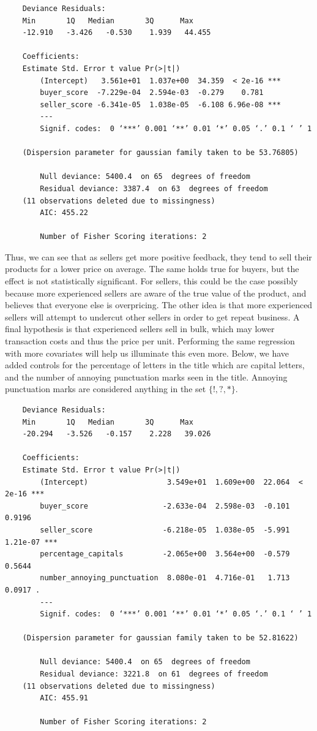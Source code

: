 \documentclass[psamsfonts]{amsart}
\begin{document}
\begin{verbatim}
    Deviance Residuals: 
    Min       1Q   Median       3Q      Max  
    -12.910   -3.426   -0.530    1.939   44.455  
    
    Coefficients:
    Estimate Std. Error t value Pr(>|t|)    
        (Intercept)   3.561e+01  1.037e+00  34.359  < 2e-16 ***
        buyer_score  -7.229e-04  2.594e-03  -0.279    0.781    
        seller_score -6.341e-05  1.038e-05  -6.108 6.96e-08 ***
        ---
        Signif. codes:  0 ‘***’ 0.001 ‘**’ 0.01 ‘*’ 0.05 ‘.’ 0.1 ‘ ’ 1 
    
    (Dispersion parameter for gaussian family taken to be 53.76805)
    
        Null deviance: 5400.4  on 65  degrees of freedom
        Residual deviance: 3387.4  on 63  degrees of freedom
    (11 observations deleted due to missingness)
        AIC: 455.22
    
        Number of Fisher Scoring iterations: 2
\end{verbatim}

Thus, we can see that as sellers get more positive feedback, they tend to sell their products for a lower price on average. The same holds true for buyers, but the effect is not statistically significant. For sellers, this could be the case possibly because more experienced sellers are aware of the true value of the product, and believes that everyone else is overpricing. The other idea is that more experienced sellers will attempt to undercut other sellers in order to get repeat business. A final hypothesis is that experienced sellers sell in bulk, which may lower transaction costs and thus the price per unit. Performing the same regression with more covariates will help us illuminate this even more. Below, we have added controls for the percentage of letters in the title which are capital letters, and the number of annoying punctuation marks seen in the title. Annoying punctuation marks are considered anything in the set $\{!,?,*\}$.

\begin{verbatim}
    Deviance Residuals: 
    Min       1Q   Median       3Q      Max  
    -20.294   -3.526   -0.157    2.228   39.026  
    
    Coefficients:
    Estimate Std. Error t value Pr(>|t|)    
        (Intercept)                  3.549e+01  1.609e+00  22.064  < 2e-16 ***
        buyer_score                 -2.633e-04  2.598e-03  -0.101   0.9196    
        seller_score                -6.218e-05  1.038e-05  -5.991 1.21e-07 ***
        percentage_capitals         -2.065e+00  3.564e+00  -0.579   0.5644    
        number_annoying_punctuation  8.080e-01  4.716e-01   1.713   0.0917 .  
        ---
        Signif. codes:  0 ‘***’ 0.001 ‘**’ 0.01 ‘*’ 0.05 ‘.’ 0.1 ‘ ’ 1 
    
    (Dispersion parameter for gaussian family taken to be 52.81622)
    
        Null deviance: 5400.4  on 65  degrees of freedom
        Residual deviance: 3221.8  on 61  degrees of freedom
    (11 observations deleted due to missingness)
        AIC: 455.91
    
        Number of Fisher Scoring iterations: 2
\end{verbatim}
\end{document}
